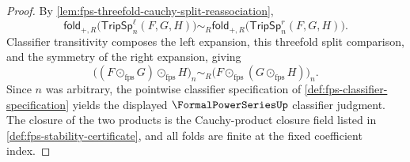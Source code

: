 \begin{proof}
By \autoref{lem:fps-threefold-cauchy-split-reassociation},
$$
\mathsf{fold}_{+,R}\bigl(\mathsf{TripSp}^{\ell}_n(F,G,H)\bigr)
\sim_R
\mathsf{fold}_{+,R}\bigl(\mathsf{TripSp}^{r}_n(F,G,H)\bigr).
$$
Classifier transitivity composes the left expansion, this threefold split comparison, and the symmetry of the right expansion, giving
$$
\bigl((F\odot_{\mathrm{fps}}G)\odot_{\mathrm{fps}}H\bigr)_n
\sim_R
\bigl(F\odot_{\mathrm{fps}}(G\odot_{\mathrm{fps}}H)\bigr)_n.
$$
Since $n$ was arbitrary, the pointwise classifier specification of \autoref{def:fps-classifier-specification} yields the displayed $\FormalPowerSeriesUp$ classifier judgment. The closure of the two products is the Cauchy-product closure field listed in \autoref{def:fps-stability-certificate}, and all folds are finite at the fixed coefficient index.
\end{proof}
